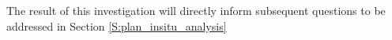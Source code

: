 The result of this investigation will directly inform subsequent questions to be addressed in Section \ref{S:plan_insitu_analysis}\\

















